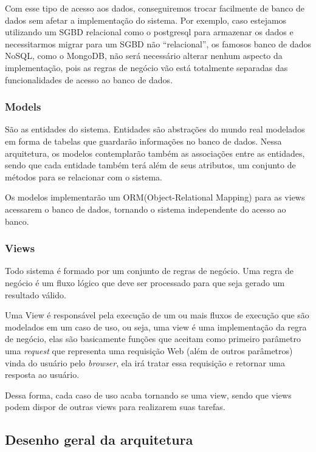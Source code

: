 Com esse tipo de acesso aos dados, conseguiremos trocar facilmente de banco de 
dados sem afetar a implementação do sistema. Por exemplo, caso estejamos 
utilizando um SGBD relacional como o postgresql para armazenar os dados e 
necessitarmos migrar para um SGBD não “relacional”, os famosos banco de dados 
NoSQL, como o MongoDB, não será necessário alterar nenhum aspecto da 
implementação, pois as regras de negócio vão está totalmente separadas das 
funcionalidades de acesso ao banco de dados.

\subsubsection{Models}
São as entidades do sistema. Entidades são abstrações do mundo real modelados em 
forma de tabelas que guardarão informações no banco de dados. Nessa arquitetura, 
os modelos contemplarão também as associações entre as entidades, sendo que cada 
entidade também terá al\'em de seus atributos, um conjunto de métodos para se 
relacionar com o sistema.

Os modelos implementarão um ORM(Object-Relational Mapping) para as views 
acessarem o banco de dados, tornando o sistema independente do acesso ao banco. 

\subsubsection{Views}
Todo sistema é formado por um conjunto de regras de negócio. Uma regra de 
neg\'ocio é um fluxo lógico que deve ser processado para que seja gerado um resultado 
válido.

Uma View é responsável pela execução de um ou mais fluxos de execução que são 
modelados em um caso de uso, ou seja, uma view é uma implementação da regra de 
neg\'ocio, elas são basicamente funções que aceitam como primeiro parâmetro uma 
\textit{request} que representa uma requisição Web (além de outros parâmetros) 
vinda do usuário pelo \textit{browser}, ela irá tratar essa requisição e 
retornar uma resposta ao usuário.

Dessa forma, cada caso de uso acaba tornando se uma view, sendo que views podem 
dispor de outras views para realizarem suas tarefas. 

\subsection{Desenho geral da arquitetura}

